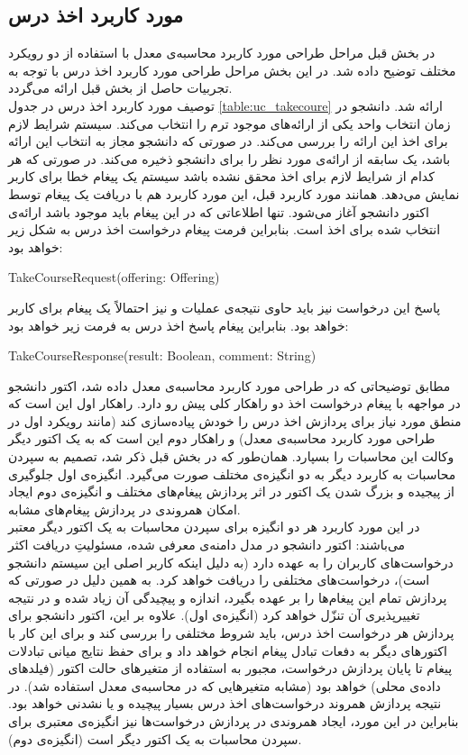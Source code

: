 \subsection{مورد کاربرد اخذ درس}
در بخش قبل مراحل طراحی مورد کاربرد محاسبه‌ی معدل با استفاده از دو رویکرد مختلف توضیح داده شد. در این بخش مراحل طراحی مورد کاربرد اخذ درس با توجه به تجربیات حاصل از بخش قبل ارائه می‌گردد. \\
توصیف مورد کاربرد اخذ درس در جدول \ref{table:uc_takecoure} ارائه شد. دانشجو در زمان انتخاب واحد یکی از ارائه‌های موجود ترم را انتخاب می‌کند. سیستم شرایط لازم برای اخذ این ارائه را بررسی می‌کند. در صورتی که دانشجو مجاز به انتخاب این ارائه باشد، یک سابقه از ارائه‌ی مورد نظر را برای دانشجو ذخیره می‌کند. در صورتی که هر کدام از شرایط لازم برای اخذ محقق نشده باشد سیستم یک پیغام خطا برای کاربر نمایش می‌دهد.
همانند مورد کاربرد قبل،‌ این مورد کاربرد هم با دریافت یک پیغام توسط اکتور دانشجو آغاز می‌شود. تنها اطلاعاتی که در این پیغام باید موجود باشد ارائه‌ی انتخاب شده برای اخذ است. بنابراین فرمت پیغام درخواست اخذ درس به شکل زیر خواهد بود:
\begin{latin}
TakeCourseRequest(offering: Offering)
\end{latin}
پاسخ این درخواست نیز باید حاوی نتیجه‌ی عملیات و نیز احتمالاً یک پیغام برای کاربر خواهد بود. بنابراین پیغام پاسخ اخذ درس به فرمت زیر خواهد بود:
\begin{latin}
TakeCourseResponse(result: Boolean, comment: String)
\end{latin}
مطابق توضیحاتی که در طراحی مورد کاربرد محاسبه‌ی معدل داده ‌شد، اکتور دانشجو در مواجهه با پیغام درخواست اخذ دو راهکار کلی پیش رو دارد. راهکار اول این است که منطق مورد نیاز برای پردازش اخذ درس را خودش پیاده‌سازی کند (مانند رویکرد اول در طراحی مورد کاربرد محاسبه‌ی معدل) و راهکار دوم این است که به یک اکتور دیگر وکالت این محاسبات را بسپارد. همان‌طور که در بخش قبل ذکر شد،‌ تصمیم به سپردن محاسبات به کاربرد دیگر به دو انگیزه‌ی مختلف صورت می‌گیرد. انگیزه‌ی اول جلوگیری از پیجیده و بزرگ شدن یک اکتور در اثر پردازش پیغام‌های مختلف و انگیزه‌ی دوم ایجاد امکان همروندی در پردازش پیغام‌های مشابه.\\
در این مورد کاربرد هر دو انگیزه برای سپردن محاسبات به یک اکتور دیگر معتبر می‌باشند: اکتور دانشجو در مدل دامنه‌ی معرفی شده، مسئولیتِ دریافت اکثر درخواست‌های کاربران را به عهده دارد (به دلیل اینکه کاربر اصلی این سیستم دانشجو است)، درخواست‌های مختلفی را دریافت خواهد کرد. به همین دلیل در صورتی که  پردازش تمام این پیغام‌ها را بر عهده بگیرد، اندازه و پیچیدگی آن زیاد شده و در نتیجه تغییرپذیری آن تنزّل خواهد کرد (انگیزه‌ی اول). علاوه بر این، اکتور دانشجو برای پردازش هر درخواست اخذ درس، باید شروط مختلفی را بررسی کند و برای این کار با اکتورهای دیگر به دفعات تبادل پیغام انجام خواهد داد و برای حفظ نتایج میانی تبادلات پیغام تا پایان پردازش درخواست، مجبور به استفاده از متغیرهای حالت اکتور (فیلدهای داده‌ی محلی) خواهد بود (مشابه متغیرهایی که در محاسبه‌ی معدل استفاده شد). در نتیجه پردازش همروند درخواست‌های اخذ درس بسیار پیچیده و یا نشدنی خواهد بود. بنابراین در این مورد، ایجاد همروندی در پردازش درخواست‌ها نیز انگیزه‌ی معتبری برای سپردن محاسبات به یک اکتور دیگر است (انگیزه‌ی دوم). \\
